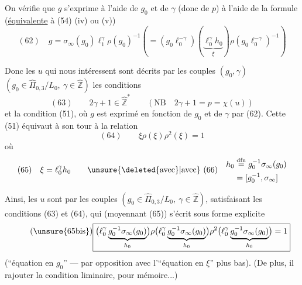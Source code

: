  On vérifie  que $g$ s'exprime à l'aide de $g_0$ et de $\gamma$ (donc de $p$) à l'aide de la formule (\uline{équivalente} à (54) (iv) ou (v))
\[
(62)\quad
\boxed{g=\sigma_\infty(g_0)\ell_1^\gamma\rho(g_0)^{-1}}
\left(=(g_0\ell_0^{-\gamma})\left(\underbrace{\ell_0^\gamma h_0}_{\xi}\right)\rho(g_0\ell_0^{-\gamma})^{-1}\right)
\]


Donc les $u$ qui nous intéressent sont décrits par les couples $(g_0,\gamma)$ $(g_0\in\widehat{\Pi}_{0,3}/L_0,\ \gamma\in\widehat{\mathbb Z})$  les conditions
\[
(63)\qquad 2\gamma+1\in\widehat{\mathbb Z}^{\ast}\qquad (\mathrm{NB}\quad 2\gamma+1=p=\chi(u))
\]
et la condition (51), où $g$ est exprimé en fonction de $g_0$ et de $\gamma$ par (62). Cette  (51) équivaut à son tour à la relation
\[
(64)\qquad\boxed{\xi\rho(\xi)\rho^2(\xi)=1}
\]
où
\[
(65)\quad\xi=\ell_0^\gamma h_0
\qquad\unsure{\deleted{\text{avec}}|\text{avec}}\ (66)\quad
\begin{aligned}
h_0&\overset{\mathrm{dfn}}{=}
g_0^{-1}\sigma_\infty(g_0)\\
&{}=[g_0^{-1},\sigma_\infty]
\end{aligned}
\]



Ainsi, les $u$ sont  par les couples
$(g_0\in\widehat{\Pi}_{0,3}/L_0,\ \gamma\in\widehat{\mathbb Z})$, satisfaisant les conditions
(63) et (64), qui (moyennant (65)) s'écrit sous forme explicite
\[
\tag{\unsure{65bis}}
\boxed{
\bigl(\ell_0^\gamma\underbrace{g_0^{-1}\sigma_\infty(g_0)}_{h_0}\bigr)
\rho\bigl(\ell_0^\gamma\underbrace{g_0^{-1}\sigma_\infty(g_0)}_{h_0}\bigr)
\rho^2\bigl(\ell_0^\gamma\underbrace{g_0^{-1}\sigma_\infty(g_0)}_{h_0}\bigr)=1
}
\]
(``équation en $g_0$'' --- par opposition avec l'``équation en $\xi$'' plus bas).
(De plus, il  rajouter la condition liminaire, pour mémoire...)

